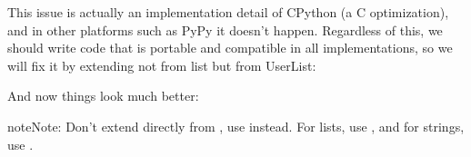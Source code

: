 \documentclass[a4paper,10pt,english]{sphinxmanual}
\begin{document}
This issue is actually an implementation detail of CPython (a C optimization), and in other platforms such as PyPy it
doesn’t happen. Regardless of this, we should write code that is portable and compatible in all implementations, so we
will fix it by extending not from list but from UserList:

\begin{sphinxVerbatim}[commandchars=\\\{\}]
   

 
      
           
              
              
              
          \PYG{l+s+s2}{[}\PYG{l+s+s2}{] }
\end{sphinxVerbatim}

And now things look much better:

\begin{sphinxVerbatim}[commandchars=\\\{\}]
    
\PYG{p}{[}\PYG{p}{]}
\PYG{p}{[}\PYG{p}{]}
\end{sphinxVerbatim}

\begin{sphinxadmonition}{note}{Note:}
Don’t extend directly from , use  instead. For lists, use , and
for strings, use .
\end{sphinxadmonition}
\end{document}

